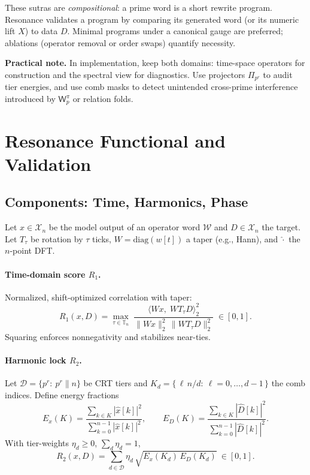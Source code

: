 \documentclass[12pt]{article}
\numberwithin{equation}{section}
\theoremstyle{plain}
\theoremstyle{definition}
\theoremstyle{remark}
\begin{document}
These sutras are \emph{compositional}: a prime word is a short rewrite program. Resonance validates a program by comparing its generated word (or its numeric lift $X$) to data $D$. Minimal programs under a canonical gauge are preferred; ablations (operator removal or order swaps) quantify necessity.

\medskip
\noindent\textbf{Practical note.} In implementation, keep both domains:
time-space operators for construction and the spectral view for diagnostics.
Use projectors $\Pi_{p^r}$ to audit tier energies, and use comb masks to detect unintended cross-prime interference introduced by $\mathsf{W}_p^{\pi}$ or relation folds.

\section*{Resonance Functional and Validation}

\subsection*{Components: Time, Harmonics, Phase}
Let $x\in\mathcal{X}_n$ be the model output of an operator word $\mathcal{W}$ and $D\in\mathcal{X}_n$ the target. Let $T_\tau$ be rotation by $\tau$ ticks, $W=\mathrm{diag}(w[t])$ a taper (e.g., Hann), and $\widehat{\cdot}$ the $n$-point DFT.

\paragraph{Time-domain score $R_1$.}
Normalized, shift-optimized correlation with taper:
\[
R_1(x,D)=\max_{\tau\in\mathbb{T}_n}\;
\frac{\big\langle Wx,\; W T_\tau D\big\rangle_2^2}{\|Wx\|_2^2\,\|WT_\tau D\|_2^2}
\;\in[0,1].
\]
Squaring enforces nonnegativity and stabilizes near-ties.

\paragraph{Harmonic lock $R_2$.}
Let $\mathcal{D}=\{p^r:\ p^r\parallel n\}$ be CRT tiers and $K_d=\{\,\ell\,n/d:\ \ell=0,\dots,d-1\,\}$ the comb indices. Define energy fractions
\[
E_x(K)=\frac{\sum_{k\in K}|\widehat{x}[k]|^2}{\sum_{k=0}^{n-1}|\widehat{x}[k]|^2},\qquad
E_D(K)=\frac{\sum_{k\in K}|\widehat{D}[k]|^2}{\sum_{k=0}^{n-1}|\widehat{D}[k]|^2}.
\]
With tier-weights $\eta_d\ge 0$, $\sum_d \eta_d=1$,
\[
R_2(x,D)=\sum_{d\in\mathcal{D}}\eta_d\,\sqrt{E_x(K_d)\,E_D(K_d)}\ \in[0,1].
\]
\end{document}
